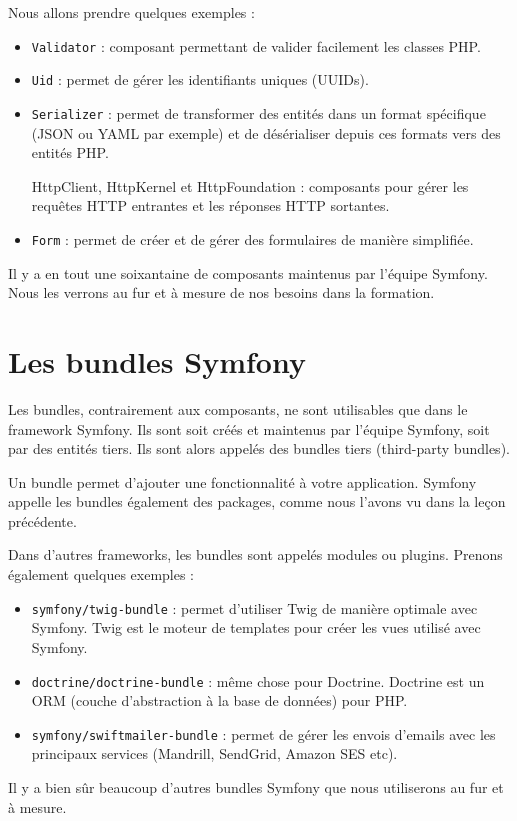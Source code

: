 \documentclass{article}
\begin{document}
Nous allons prendre quelques exemples :
\begin{itemize}
\item {\tt Validator} : composant permettant de valider facilement les classes PHP.

\item {\tt Uid} : permet de gérer les identifiants uniques (UUIDs).

\item {\tt Serializer} : permet de transformer des entités dans un format spécifique (JSON ou YAML par exemple) et de désérialiser depuis ces formats vers des entités PHP.

HttpClient, HttpKernel et HttpFoundation : composants pour gérer les requêtes HTTP entrantes et les réponses HTTP sortantes.

\item {\tt Form} : permet de créer et de gérer des formulaires de manière simplifiée.

\end{itemize}

Il y a en tout une soixantaine de composants maintenus par l'équipe Symfony. Nous les verrons au fur et à mesure de nos besoins dans la formation.

\section{Les bundles Symfony}
Les bundles, contrairement aux composants, ne sont utilisables que dans le framework Symfony. Ils sont soit créés et maintenus par l'équipe Symfony, soit par des entités tiers. Ils sont alors appelés des bundles tiers (third-party bundles).

Un bundle permet d'ajouter une fonctionnalité à votre application. Symfony appelle les bundles également des packages, comme nous l'avons vu dans la leçon précédente.

Dans d'autres frameworks, les bundles sont appelés modules ou plugins. Prenons également quelques exemples :

\begin{itemize}
\item {\tt symfony/twig-bundle} : permet d'utiliser Twig de manière optimale avec Symfony. Twig est le moteur de templates pour créer les vues utilisé avec Symfony.

\item {\tt doctrine/doctrine-bundle} : même chose pour Doctrine. Doctrine est un ORM (couche d'abstraction à la base de données) pour PHP.

\item {\tt symfony/swiftmailer-bundle} : permet de gérer les envois d'emails avec les principaux services (Mandrill, SendGrid, Amazon SES etc).

\end{itemize}
Il y a bien sûr beaucoup d'autres bundles Symfony que nous utiliserons au fur et à mesure.
\end{document}
